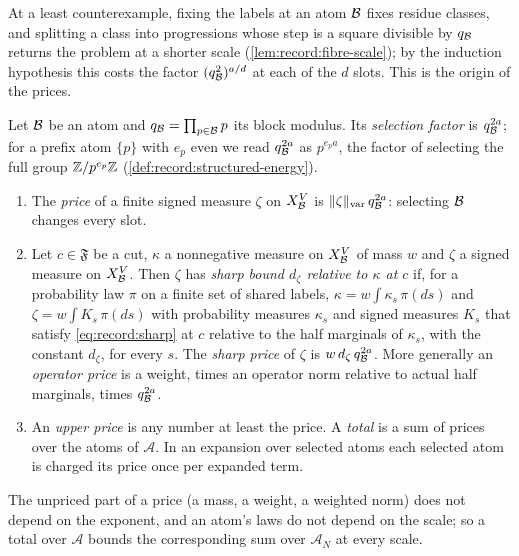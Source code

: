 At a least counterexample, fixing the labels at an atom $\mathcal B$ fixes residue
classes, and splitting a class into progressions whose step is a square
divisible by $q_{\mathcal B}$ returns the problem at a shorter scale
(\cref{lem:record:fibre-scale}); by the induction hypothesis this costs the
factor $(q_{\mathcal B}^2)^{a/d}$ at each of the $d$ slots. This is the origin of
the prices.

\begin{definition}[Prices]\label{def:price}
Let $\mathcal B$ be an atom and $q_{\mathcal B}=\prod_{p\in\mathcal B}p$ its block modulus. Its
\emph{selection factor} is $q_{\mathcal B}^{2a}$; for a prefix atom $\{p\}$ with
$e_p$ even we read $q_{\mathcal B}^{2a}$ as $p^{e_pa}$, the factor of selecting the
full group $\mathbb Z/p^{e_p}\mathbb Z$ (\cref{def:record:structured-energy}).
\begin{enumerate}[label=(\alph*)]
\item The \emph{price} of a finite signed measure $\zeta$ on $X_{\mathcal B}^V$ is
 $\|\zeta\|_{\rm var}\,q_{\mathcal B}^{2a}$: selecting $\mathcal B$ changes every slot.
\item Let $c\in\mathfrak F$ be a cut, $\kappa$ a nonnegative measure on
 $X_{\mathcal B}^V$ of mass $w$ and $\zeta$ a signed measure on $X_{\mathcal B}^V$. Then
 $\zeta$ has \emph{sharp bound $d_\zeta$ relative to $\kappa$ at $c$} if, for a
 probability law $\pi$ on a finite set of shared labels,
 $\kappa=w\int\kappa_s\,\pi(ds)$ and $\zeta=w\int K_s\,\pi(ds)$ with
 probability measures $\kappa_s$ and signed measures $K_s$ that satisfy
 \eqref{eq:record:sharp} at $c$ relative to the half marginals of $\kappa_s$,
 with the constant $d_\zeta$, for every $s$. The \emph{sharp price} of $\zeta$
 is $w\,d_\zeta\,q_{\mathcal B}^{2a}$. More generally an \emph{operator price} is a
 weight, times an operator norm relative to actual half marginals, times
 $q_{\mathcal B}^{2a}$.
\item An \emph{upper price} is any number at least the price. A \emph{total}
 is a sum of prices over the atoms of $\mathcal A$. In an expansion over
 selected atoms each selected atom is charged its price once per expanded
 term.
\end{enumerate}
\end{definition}

The unpriced part of a price (a mass, a weight, a weighted norm) does not
depend on the exponent, and an atom's laws do not depend on the scale; so a
total over $\mathcal A$ bounds the corresponding sum over $\mathcal A_N$ at
every scale.

